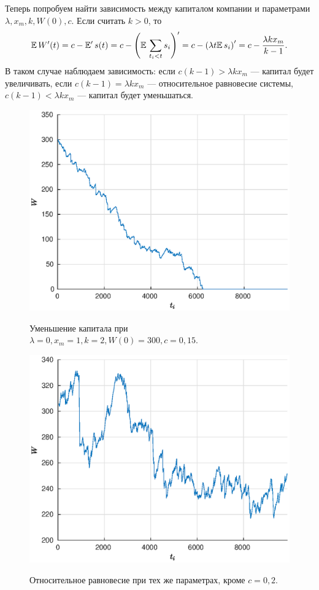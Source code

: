 Теперь попробуем найти зависимость между капиталом компании и параметрами $\lambda, x_m, k, W(0), c$. Если считать $k > 0$, то
$$
        \mathbb{E}\,W'(t)
=
        c - \mathbb{E}'\,s(t)
=
        c - \left(
\mathbb{E}\,
\sum_{t_i < t}
s_i
        \right)'
=
        c - \left(
\lambda t \mathbb{E}\,s_i
        \right)'
=
        c - \frac{
\lambda k x_m
        }{
k - 1
        }.
$$
В таком случае наблюдаем зависимость:
если $c(k-1) > \lambda k x_m$ --- капитал будет увеличивать, если $c(k-1) = \lambda k x_m$ --- относительное равновесие системы, $c(k-1) < \lambda k x_m$ --- капитал будет уменьшаться.
\begin{figure}[h]
        \noindent
        \centering
        {
        \includegraphics[width=120mm]{task_11/3down.eps}}
        \caption{Уменьшение капитала при $\lambda = 0, x_m = 1, k = 2, W(0) = 300, c = 0,\!15$.}
\end{figure}
\clearpage
\begin{figure}[t]
\noindent
        \centering
        {
        \includegraphics[width=120mm]{task_11/3equal.eps}}
        \caption{Относительное равновесие при тех же параметрах, кроме $c = 0,\!2$.}
\end{figure}
